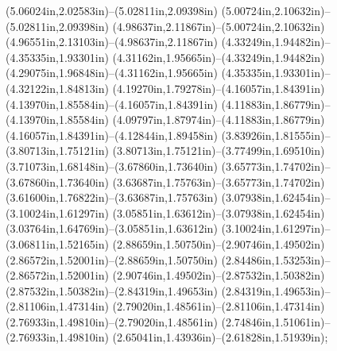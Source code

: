 (5.06024in,2.02583in)--(5.02811in,2.09398in) (5.00724in,2.10632in)--(5.02811in,2.09398in) (4.98637in,2.11867in)--(5.00724in,2.10632in) (4.96551in,2.13103in)--(4.98637in,2.11867in) (4.33249in,1.94482in)--(4.35335in,1.93301in) (4.31162in,1.95665in)--(4.33249in,1.94482in) (4.29075in,1.96848in)--(4.31162in,1.95665in) (4.35335in,1.93301in)--(4.32122in,1.84813in) (4.19270in,1.79278in)--(4.16057in,1.84391in) (4.13970in,1.85584in)--(4.16057in,1.84391in) (4.11883in,1.86779in)--(4.13970in,1.85584in) (4.09797in,1.87974in)--(4.11883in,1.86779in) (4.16057in,1.84391in)--(4.12844in,1.89458in) (3.83926in,1.81555in)--(3.80713in,1.75121in) (3.80713in,1.75121in)--(3.77499in,1.69510in) (3.71073in,1.68148in)--(3.67860in,1.73640in) (3.65773in,1.74702in)--(3.67860in,1.73640in) (3.63687in,1.75763in)--(3.65773in,1.74702in) (3.61600in,1.76822in)--(3.63687in,1.75763in) (3.07938in,1.62454in)--(3.10024in,1.61297in) (3.05851in,1.63612in)--(3.07938in,1.62454in) (3.03764in,1.64769in)--(3.05851in,1.63612in) (3.10024in,1.61297in)--(3.06811in,1.52165in) (2.88659in,1.50750in)--(2.90746in,1.49502in) (2.86572in,1.52001in)--(2.88659in,1.50750in) (2.84486in,1.53253in)--(2.86572in,1.52001in) (2.90746in,1.49502in)--(2.87532in,1.50382in) (2.87532in,1.50382in)--(2.84319in,1.49653in) (2.84319in,1.49653in)--(2.81106in,1.47314in) (2.79020in,1.48561in)--(2.81106in,1.47314in) (2.76933in,1.49810in)--(2.79020in,1.48561in) (2.74846in,1.51061in)--(2.76933in,1.49810in) (2.65041in,1.43936in)--(2.61828in,1.51939in);
